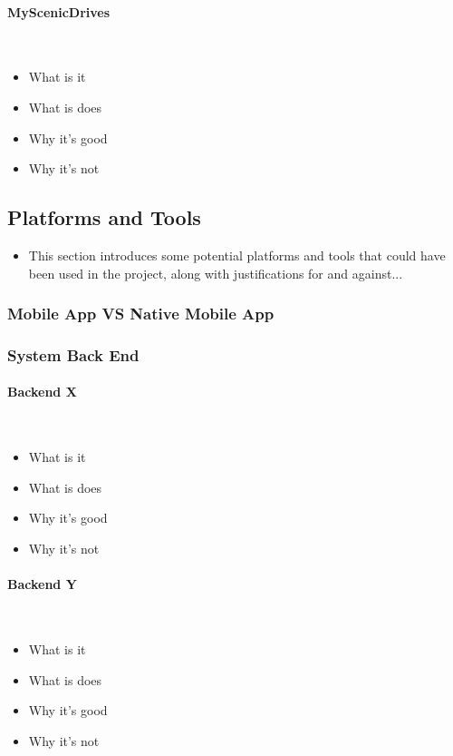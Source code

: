 \paragraph{MyScenicDrives}\ \\
{\color{red}
	\begin{itemize}
		\item What is it
		\item What is does
		\item Why it's good
		\item Why it's not
	\end{itemize}
}


\subsection{Platforms and Tools}
\label{sec:pat}

{\color{red}
	\begin{itemize}
		\item This section introduces some potential platforms and tools that could have been used in the project, along with justifications for and against...
	\end{itemize}
}

\subsubsection{Mobile App VS Native Mobile App}

\subsubsection{System Back End}
\paragraph{Backend X}\ \\
{\color{red}
	\begin{itemize}
		\item What is it
		\item What is does
		\item Why it's good
		\item Why it's not
	\end{itemize}
}
\paragraph{Backend Y}\ \\
{\color{red}
	\begin{itemize}
		\item What is it
		\item What is does
		\item Why it's good
		\item Why it's not
	\end{itemize}
}
